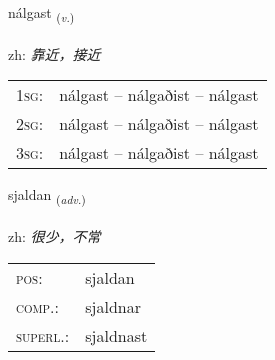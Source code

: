 \documentclass[frontgrid, backgrid]{flacards}\usepackage[]{graphicx}\usepackage[]{color}
\begin{document}
\renewcommand{\flhead}{\vskip5pt \fboxsep=0pt {\small\bfseries\footnotesize Sagnorð | 动词}}
\renewcommand{\fcfoot}{\vskip5pt \fboxsep=0pt \hspace{2pt}{\small\bfseries\footnotesize 2K}}

\renewcommand{\blhead}{\vskip5pt {\small\bfseries\footnotesize Sagnorð | 动词 }}
\renewcommand{\bcfoot}{\vskip5pt \hspace{2pt}{\small\bfseries\footnotesize 2K}}


{nálgast \small{\textsubscript{(\textit{v.})}} \\[1ex] %
\textphonetic{[naulkast]} \\
zh: \emph{靠近，接近} \\  [2ex]
\renewcommand*{\arraystretch}{0.8}
\begin{tabular}{p{1cm}l}
\textsc{1sg}: & nálgast -- nálgaðist -- nálgast \\ 
\textsc{2sg}: & nálgast -- nálgaðist -- nálgast \\ 
\textsc{3sg}: & nálgast -- nálgaðist -- nálgast \\ 
\end{tabular}
}

\renewcommand{\flhead}{\vskip5pt \fboxsep=0pt {\small\bfseries\footnotesize Atviksorð | 副词}}
\renewcommand{\fcfoot}{\vskip5pt \fboxsep=0pt \hspace{2pt}{\small\bfseries\footnotesize 2K}}

\renewcommand{\blhead}{\vskip5pt {\small\bfseries\footnotesize Atviksorð | 副词 }}
\renewcommand{\bcfoot}{\vskip5pt \hspace{2pt}{\small\bfseries\footnotesize 2K}}


{sjaldan \small{\textsubscript{(\textit{adv.})}} \\[1ex] %
\textphonetic{[sjaltan]} \\
zh: \emph{很少，不常} \\  [2ex]
\renewcommand*{\arraystretch}{0.8}
\begin{tabular}{ll}
\textsc{pos}: & sjaldan \\ 
\textsc{comp.}: & sjaldnar \\ 
\textsc{superl.}: & sjaldnast \\
\end{tabular}
}
\end{document}
